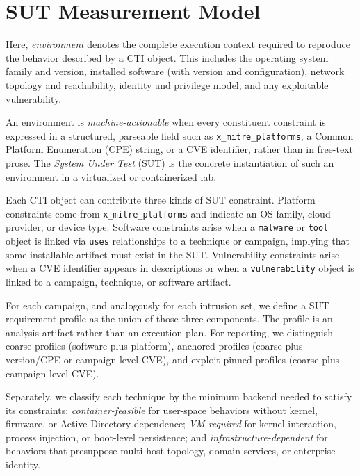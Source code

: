 \documentclass[sigconf]{acmart}
\begin{document}
\section{SUT Measurement Model}\label{sec:definitions}

Here, \emph{environment} denotes the complete execution context required to reproduce the behavior described by a CTI object. This includes the operating system family and version, installed software (with version and configuration), network topology and reachability, identity and privilege model, and any exploitable vulnerability.

An environment is \emph{machine-actionable} when every constituent constraint is expressed in a structured, parseable field such as \nolinkurl{x_mitre_platforms}, a Common Platform Enumeration (CPE) string, or a CVE identifier, rather than in free-text prose. The \emph{System Under Test} (SUT) is the concrete instantiation of such an environment in a virtualized or containerized lab.

Each CTI object can contribute three kinds of SUT constraint. Platform constraints come from \texttt{x\_mitre\_platforms} and indicate an OS family, cloud provider, or device type. Software constraints arise when a \texttt{malware} or \texttt{tool} object is linked via \texttt{uses} relationships to a technique or campaign, implying that some installable artifact must exist in the SUT. Vulnerability constraints arise when a CVE identifier appears in descriptions or when a \texttt{vulnerability} object is linked to a campaign, technique, or software artifact.

For each campaign, and analogously for each intrusion set, we define a SUT requirement profile as the union of those three components. The profile is an analysis artifact rather than an execution plan. For reporting, we distinguish coarse profiles (software plus platform), anchored profiles (coarse plus version/CPE or campaign-level CVE), and exploit-pinned profiles (coarse plus campaign-level CVE).

Separately, we classify each technique by the minimum backend needed to satisfy its constraints: \emph{container-feasible} for user-space behaviors without kernel, firmware, or Active Directory dependence; \emph{VM-required} for kernel interaction, process injection, or boot-level persistence; and \emph{infrastructure-dependent} for behaviors that presuppose multi-host topology, domain services, or enterprise identity.
\end{document}
